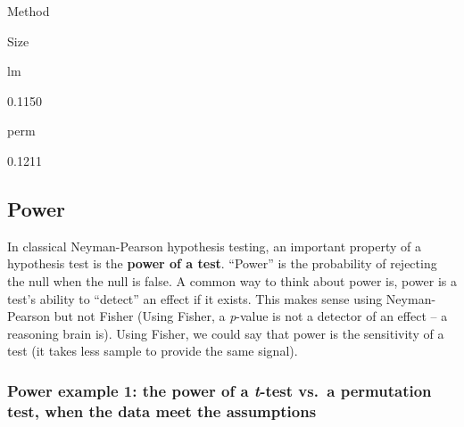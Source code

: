 \documentclass[]{book}
\begin{document}
Method

Size

lm

0.1150

perm

0.1211

\hypertarget{power}{%
\subsection{Power}\label{power}}

In classical Neyman-Pearson hypothesis testing, an important property of a hypothesis test is the \textbf{power of a test}. ``Power'' is the probability of rejecting the null when the null is false. A common way to think about power is, power is a test's ability to ``detect'' an effect if it exists. This makes sense using Neyman-Pearson but not Fisher (Using Fisher, a \emph{p}-value is not a detector of an effect -- a reasoning brain is). Using Fisher, we could say that power is the sensitivity of a test (it takes less sample to provide the same signal).

\hypertarget{power-example-1-the-power-of-a-t-test-vs.-a-permutation-test-when-the-data-meet-the-assumptions}{%
\subsubsection{\texorpdfstring{Power example 1: the power of a \emph{t}-test vs.~a permutation test, when the data meet the assumptions}{Power example 1: the power of a t-test vs.~a permutation test, when the data meet the assumptions}}\label{power-example-1-the-power-of-a-t-test-vs.-a-permutation-test-when-the-data-meet-the-assumptions}}
\end{document}
